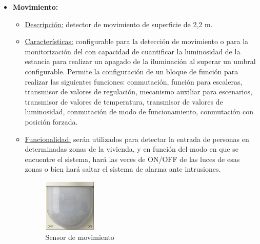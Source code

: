 \begin{itemize}
\item \textbf{Movimiento:} 
	\begin{itemize}
	\item\underline{Descripción:} detector de movimiento de superficie de 2,2 m.
	\item \underline{Características:} configurable para la detección de movimiento o para la monitorización del con capacidad de cuantificar la luminosidad de la estancia para realizar un apagado de la iluminación al superar un umbral configurable. Permite la configuración de un bloque de función para realizar las siguientes funciones: conmutación, función para escaleras, transmisor de valores de regulación, mecanismo auxiliar para escenarios, transmisor de valores de temperatura, transmisor de valores de luminosidad, conmutación de modo de funcionamiento, conmutación con posición forzada.
	\item \underline{Funcionalidad:} serán utilizados para detectar la entrada de personas en determinadas zonas de la vivienda, y en función del modo en que se encuentre el sistema, hará las veces de ON/OFF de las luces de esas zonas o bien hará saltar el sistema de alarma ante intrusiones.
	\begin{figure}[h]
	\centering
	\includegraphics[width=0.25\textwidth]{figures/sensor_movimiento.png}   
	\caption{Sensor de movimiento}
	\label{fig:sensor_movimiento}
	\end{figure}
	\end{itemize} 


\end{itemize}
